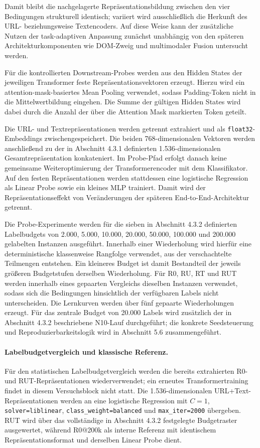 Damit bleibt die nachgelagerte Repräsentationsbildung zwischen den vier Bedingungen
strukturell identisch; variiert wird ausschließlich die Herkunft des URL- beziehungsweise
Textencoders. Auf diese Weise kann der zusätzliche Nutzen der task-adaptiven Anpassung
zunächst unabhängig von den späteren Architekturkomponenten wie DOM-Zweig und
multimodaler Fusion untersucht werden.

Für die kontrollierten Downstream-Probes werden aus den Hidden States der jeweiligen
Transformer feste Repräsentationsvektoren erzeugt. Hierzu wird ein
attention-mask-basiertes Mean Pooling verwendet, sodass Padding-Token nicht in die
Mittelwertbildung eingehen. Die Summe der gültigen Hidden States wird dabei durch die Anzahl
der über die Attention Mask markierten Token geteilt.

Die URL- und Textrepräsentationen werden getrennt extrahiert und als
\texttt{float32}-Embeddings zwischengespeichert. Die beiden 768-dimensionalen Vektoren werden
anschließend zu der in Abschnitt 4.3.1 definierten 1.536-dimensionalen Gesamtrepräsentation
konkateniert. Im Probe-Pfad erfolgt danach keine gemeinsame Weiteroptimierung der
Transformerencoder mit dem Klassifikator. Auf den festen Repräsentationen werden stattdessen
eine logistische Regression als Linear Probe sowie ein kleines MLP trainiert. Damit wird der
Repräsentationseffekt von Veränderungen der späteren End-to-End-Architektur getrennt.

Die Probe-Experimente werden für die sieben in Abschnitt 4.3.2 definierten Labelbudgets von
2.000, 5.000, 10.000, 20.000, 50.000, 100.000 und 200.000 gelabelten Instanzen
ausgeführt. Innerhalb einer Wiederholung wird hierfür eine deterministische klassenweise
Rangfolge verwendet, aus der verschachtelte Teilmengen entstehen. Ein kleineres Budget ist
damit Bestandteil der jeweils größeren Budgetstufen derselben Wiederholung. Für R0, RU, RT
und RUT werden innerhalb eines gepaarten Vergleichs dieselben Instanzen verwendet, sodass
sich die Bedingungen hinsichtlich der verfügbaren Labels nicht unterscheiden. Die Lernkurven
werden über fünf gepaarte Wiederholungen erzeugt. Für das zentrale Budget von 20.000 Labels
wird zusätzlich der in Abschnitt 4.3.2 beschriebene N10-Lauf durchgeführt; die konkrete
Seedsteuerung und Reproduzierbarkeitslogik wird in Abschnitt 5.6 zusammengeführt.

\paragraph{Labelbudgetvergleich und klassische Referenz.}
Für den statistischen Labelbudgetvergleich werden die bereits extrahierten R0- und
RUT-Repräsentationen wiederverwendet; ein erneutes Transformertraining findet in diesem
Versuchsblock nicht statt. Die 1.536-dimensionalen URL+Text-Repräsentationen werden an eine
logistische Regression mit $C=1$, \texttt{solver=liblinear},
\nolinkurl{class_weight=balanced} und \nolinkurl{max_iter=2000} übergeben. RUT wird über das
vollständige in Abschnitt 4.3.2 festgelegte Budgetraster ausgewertet, während R0@200k als
interne Referenz mit identischem Repräsentationsformat und derselben Linear Probe dient.

